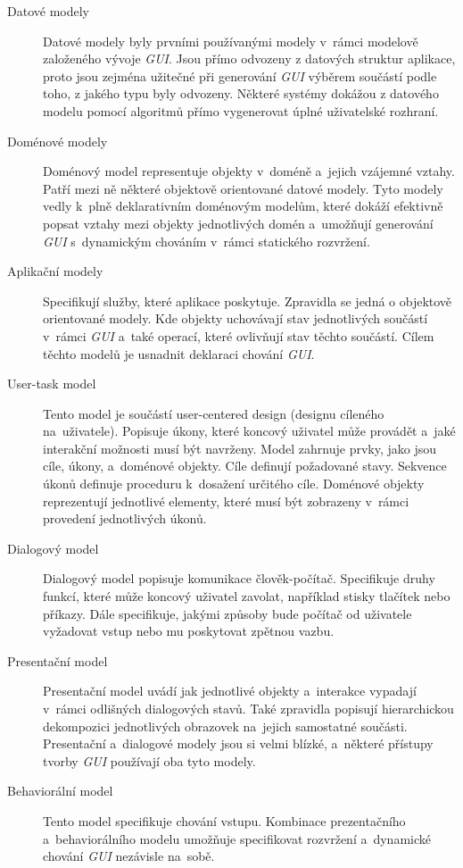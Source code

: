 \documentclass[11pt,twoside,a4paper]{book}
\begin{document}
\begin{description}
\item[Datové modely]
Datové modely byly prvními používanými modely v~rámci modelově založeného vývoje \textit{GUI}. Jsou přímo odvozeny z datových struktur aplikace, proto jsou zejména užitečné při generování \textit{GUI} výběrem součástí podle toho, z jakého typu byly odvozeny. Některé systémy dokážou z datového modelu pomocí algoritmů přímo vygenerovat úplné uživatelské rozhraní. \cite{bib:model2}
\item[Doménové modely]
Doménový model representuje objekty v~doméně a~jejich vzájemné vztahy. Patří mezi ně některé objektově orientované datové modely. Tyto modely vedly k~plně deklarativním doménovým modelům, které dokáží efektivně popsat vztahy mezi objekty jednotlivých domén a~umožňují generování \textit{GUI} s~dynamickým chováním v~rámci statického rozvržení.
\item[Aplikační modely]
Specifikují služby, které aplikace poskytuje. Zpravidla se jedná o objektově orientované modely. Kde objekty uchovávají stav jednotlivých součástí v~rámci \textit{GUI} a~také operací, které ovlivňují stav těchto součástí. Cílem těchto modelů je usnadnit deklaraci chování \textit{GUI}.
\item[User-task model]
Tento model je součástí user-centered design (designu cíleného na~uživatele). Popisuje úkony, které koncový uživatel může provádět a~jaké interakční možnosti musí být navrženy. Model zahrnuje prvky, jako jsou cíle, úkony, a~doménové objekty. Cíle definují požadované stavy. Sekvence úkonů definuje proceduru k~dosažení určitého cíle. Doménové objekty reprezentují jednotlivé elementy, které musí být zobrazeny v~rámci provedení jednotlivých úkonů.
\item[Dialogový model]
Dialogový model popisuje komunikace člověk-počítač. Specifikuje druhy funkcí, které může koncový uživatel zavolat, například stisky tlačítek nebo příkazy. Dále specifikuje, jakými způsoby bude počítač od uživatele vyžadovat vstup nebo mu poskytovat zpětnou vazbu.
\item[Presentační model]
Presentační model uvádí jak jednotlivé objekty a~interakce vypadají v~rámci odlišných dialogových stavů. Také zpravidla popisují hierarchickou dekompozici jednotlivých obrazovek na~jejich samostatné součásti. Presentační a~dialogové modely jsou si velmi blízké, a~některé přístupy tvorby \textit{GUI} používají oba tyto modely.
\item[Behaviorální model]
Tento model specifikuje chování vstupu. Kombinace prezentačního a~behaviorálního modelu umožňuje specifikovat rozvržení a~dynamické chování \textit{GUI} nezávisle na~sobě.
\end{description}
\end{document}

